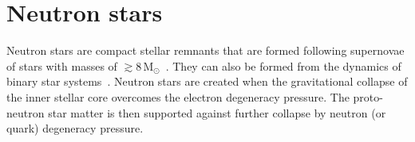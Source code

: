 \documentclass[../Thesis.tex]{subfiles}
\begin{document}
    
    







    \section{Neutron stars}
    \label{sec:Intro:NeutronStars}
    Neutron stars are compact stellar remnants that are formed following supernovae of stars with masses of $\gtrsim 8\,\mathrm{M}_\odot$~\cite[e.g.,][]{Lattimer2004}.
    They can also be formed from the dynamics of binary star systems~\cite[e.g.,][]{Ruiter2019,LiuX2020,LiuD2020}.
    Neutron stars are created when the gravitational collapse of the inner stellar core overcomes the electron degeneracy pressure.
    The proto-neutron star matter is then supported against further collapse by neutron (or quark) degeneracy pressure. \par
    
\end{document}

